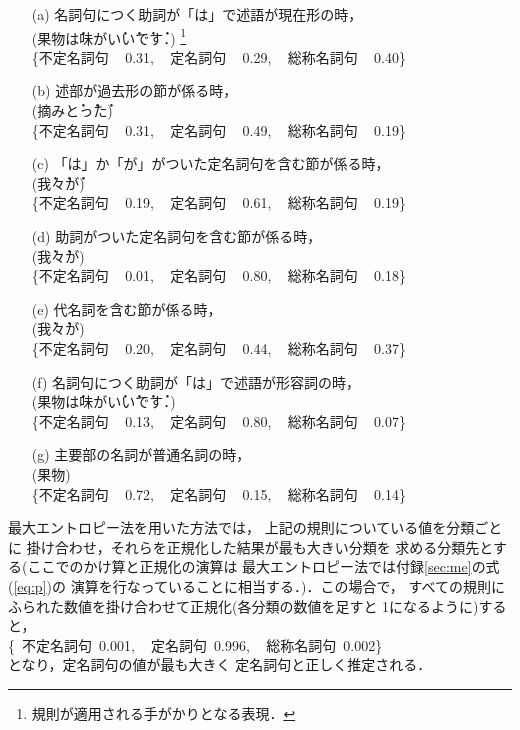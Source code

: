 \begin{itemize}
\item[(a)] 名詞句につく助詞が「は」で述語が現在形の時，\\(果物\.は味が\.い\.い\.で\.す．)
\footnote{規則が適用される手がかりとなる表現．}
\\
\mbox{\{\mbox{不定名詞句}  \, 0.31, \,
\mbox{定名詞句}    \, 0.29,   \,
\mbox{総称名詞句}  \, 0.40\}}

\item[(b)] 述部が過去形の節が係る時，\\(摘み\.と\.っ\.た)\\
\mbox{\{\mbox{不定名詞句}  \, 0.31, \,
\mbox{定名詞句}    \, 0.49, \, 
\mbox{総称名詞句}  \, 0.19\}}

\item[(c)] 「は」か「が」がついた定名詞句を含む節が係る時，\\(\.我\.々\.が)\\
\mbox{\{\mbox{不定名詞句}  \, 0.19, \,
\mbox{定名詞句}    \, 0.61, \,
\mbox{総称名詞句}  \, 0.19\}}

\item[(d)] 助詞がついた定名詞句を含む節が係る時，\\(\.我\.々が)\\
\mbox{\{\mbox{不定名詞句}  \, 0.01, \,
\mbox{定名詞句}    \, 0.80, \,
\mbox{総称名詞句}  \, 0.18\}}

\item[(e)] 代名詞を含む節が係る時，\\(\.我\.々が)\\
\mbox{\{\mbox{不定名詞句}  \, 0.20, \,
\mbox{定名詞句}    \, 0.44, \,
\mbox{総称名詞句}  \, 0.37\}}

\item[(f)] 名詞句につく助詞が「は」で述語が形容詞の時，\\(果物\.は味が\.い\.い\.で\.す．)\\
\mbox{\{\mbox{不定名詞句}  \, 0.13, \,
\mbox{定名詞句}  \,  0.80, \,
\mbox{総称名詞句} \, 0.07\}}

\item[(g)] 主要部の名詞が普通名詞の時，\\(果物)\\
\mbox{\{\mbox{不定名詞句}  \, 0.72, \,
\mbox{定名詞句}  \,  0.15, \,
\mbox{総称名詞句} \,  0.14\}}

\end{itemize}

最大エントロピー法を用いた方法では，
上記の規則についている値を分類ごとに
掛け合わせ，それらを正規化した結果が最も大きい分類を
求める分類先とする(ここでのかけ算と正規化の演算は
最大エントロピー法では付録\ref{sec:me}の式(\ref{eq:p})の
演算を行なっていることに相当する．)．この場合で，
すべての規則にふられた数値を掛け合わせて正規化(各分類の数値を足すと
1になるように)すると，\\
\mbox{\{
\mbox{不定名詞句}  0.001, \,
\mbox{定名詞句}    0.996, \,
\mbox{総称名詞句}  0.002\}}\\
となり，定名詞句の値が最も大きく
定名詞句と正しく推定される．

